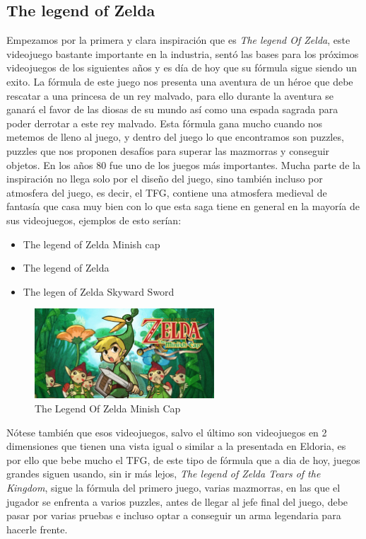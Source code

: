 \documentclass[a4paper]{article}
\begin{document}
\begin{appendices}
    \subsection{The legend of Zelda}
    Empezamos por la primera y clara inspiración que es \textit{The legend Of Zelda}, este videojuego bastante importante en la industria, sentó las bases para los próximos videojuegos de los siguientes años
    y es día de hoy que su fórmula sigue siendo un exito. La fórmula de este juego nos presenta una aventura de un héroe que debe rescatar a una princesa de un rey malvado, para ello durante la aventura se ganará
    el favor de las diosas de su mundo así como una espada sagrada para poder derrotar a este rey malvado. Esta fórmula gana mucho cuando nos metemos de lleno al juego, y dentro del juego lo que encontramos son puzzles,
    puzzles que nos proponen desafíos para superar las mazmorras y conseguir objetos. En los años 80 fue uno de los juegos más importantes. Mucha parte de la inspiración no llega solo por el diseño del juego, sino también
    incluso por atmosfera del juego, es decir, el TFG, contiene una atmosfera medieval de fantasía que casa muy bien con lo que esta saga tiene en general en la mayoría de sus videojuegos, ejemplos de esto serían:
    \begin{itemize}
        \item The legend of Zelda Minish cap
        \item The legend of Zelda
        \item The legen of Zelda Skyward Sword
    \end{itemize}

    \begin{figure}[ht]
        \centering
        \includegraphics[width=0.6\textwidth]{Images/SI_GBA_TheLegendOfZeldaTheMinishCap_image1600w.jpg}
        \caption{The Legend Of Zelda Minish Cap}
        \label{fig:Zelda}
    \end{figure}

    Nótese también que esos videojuegos, salvo el último son videojuegos en 2 dimensiones que tienen una vista igual o similar a la presentada en Eldoria, es por ello que bebe mucho el TFG, de este tipo de fórmula que 
    a dia de hoy, juegos grandes siguen usando, sin ir más lejos, \textit{The legend of Zelda Tears of the Kingdom}, sigue la fórmula del primero juego, varias mazmorras, en las que el jugador se enfrenta a varios puzzles,
    antes de llegar al jefe final del juego, debe pasar por varias pruebas e incluso optar a conseguir un arma legendaria para hacerle frente.


\end{appendices}
\end{document}
